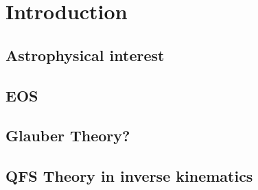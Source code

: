\section{Introduction}
\subsection{Astrophysical interest}
\subsection{EOS}
\subsection{Glauber Theory?}
\subsection{QFS Theory in inverse kinematics}
